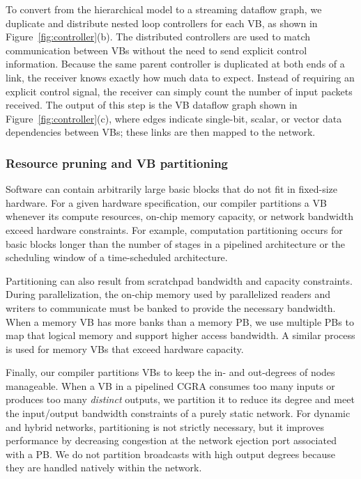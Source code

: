 To convert from the hierarchical model to a streaming dataflow graph, we duplicate and distribute nested loop controllers for each VB, as shown in Figure~\ref{fig:controller}(b). 
The distributed controllers are used to match communication between VBs without the need to send explicit control information.
Because the same parent controller is duplicated at both ends of a link, the receiver knows exactly how much data to expect.
Instead of requiring an explicit control signal, the receiver can simply count the number of input packets received.
The output of this step is the VB dataflow graph shown in Figure~\ref{fig:controller}(c), where edges indicate single-bit, scalar, or vector
data dependencies between VBs; these links are then mapped to the network.

\subsubsection{Resource pruning and VB partitioning} \label{sec:partition}
Software can contain arbitrarily large basic blocks that do not fit in fixed-size hardware. 
For a given hardware specification, our compiler partitions a VB whenever its compute resources, on-chip memory capacity, or network bandwidth exceed hardware constraints. 
For example, computation partitioning occurs for basic blocks longer than the number of stages in a pipelined architecture or the scheduling window of a time-scheduled architecture. 

Partitioning can also result from scratchpad bandwidth and capacity constraints.
During parallelization, the on-chip memory used by parallelized readers and writers to communicate must be banked to provide the necessary bandwidth. 
When a memory VB has more banks than a memory PB, we use multiple PBs to map that logical memory and support higher access bandwidth. 
A similar process is used for memory VBs that exceed hardware capacity.

Finally, our compiler partitions VBs to keep the in- and out-degrees of nodes manageable.
When a VB in a pipelined CGRA consumes too many inputs or produces too many \emph{distinct} outputs, we partition it to reduce its degree and meet the input/output bandwidth constraints of a purely static network. 
For dynamic and hybrid networks, partitioning is not strictly necessary, but it improves performance by decreasing congestion at the network ejection port associated with a PB.
We do not partition broadcasts with high output degrees because they are handled natively within the network. 


